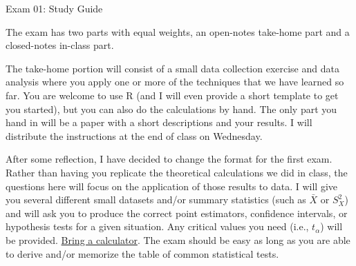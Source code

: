 \documentclass{tufte-handout}
\begin{document}
\justify

{\LARGE Exam 01: Study Guide}

\vspace*{18pt}

\noindent
The exam has two parts with equal weights, an open-notes
take-home part and a closed-notes in-class part.

\vspace*{18pt}

\noindent
The take-home
portion will consist of a small data collection exercise and
data analysis where you apply one or more of the techniques that
we have learned so far. You are welcome to use R (and I will 
even provide a short template to get you started), but you
can also do the calculations by hand. The only part you hand
in will be a paper with a short descriptions and your results.
I will distribute the instructions at the end of class on Wednesday.

\vspace*{18pt}

\noindent
After some reflection, I have decided to change the format for
the first exam. Rather than having you replicate the theoretical
calculations we did in class, the questions here will focus on
the application of those results to data. I will give you several
different small datasets and/or summary statistics (such as $\bar{X}$
or $S_X^2$) and will ask you to produce the correct point estimators,
confidence intervals, or hypothesis tests for a given situation. Any
critical values you need (i.e., $t_{\alpha}$) will be provided.
\underline{Bring a calculator}. The exam should be easy as long as
you are able to derive and/or memorize the table of common statistical
tests.
\end{document}
